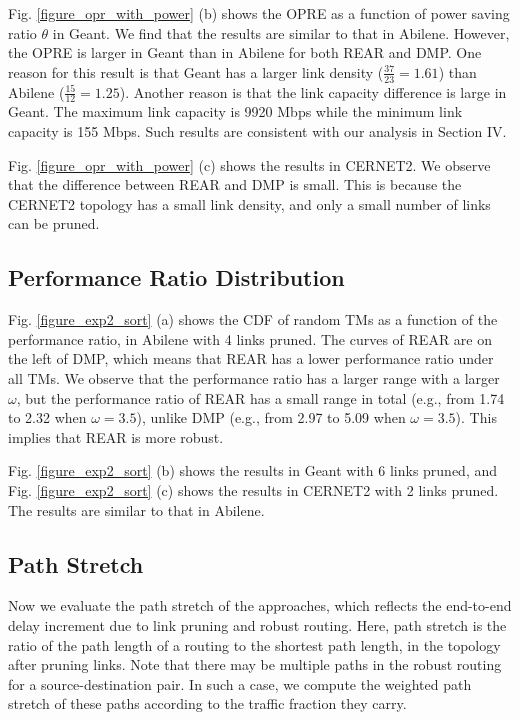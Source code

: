 \documentclass[conference]{IEEEtran}
\begin{document}
Fig. \ref{figure_opr_with_power} (b) shows the OPRE as a function of power saving ratio $\theta$ in Geant. We find that the results are similar to that in Abilene. However, the OPRE is larger in Geant than in Abilene for both REAR and DMP. One reason for this result is that Geant has a larger link density ($\frac{37}{23} = 1.61$) than Abilene ($\frac{15}{12} = 1.25$). Another reason is that the link capacity difference is large in Geant. The maximum link capacity is 9920 Mbps while the minimum link capacity is 155 Mbps. Such results are consistent with our analysis in Section IV.

Fig. \ref{figure_opr_with_power} (c) shows the results in CERNET2. We observe that the difference between REAR and DMP is small. This is because the CERNET2 topology has a small link density, and only a small number of links can be pruned.

\subsection{Performance Ratio Distribution}
Fig. \ref{figure_exp2_sort} (a) shows the CDF of random TMs as a function of the performance ratio, in Abilene with 4 links pruned. The curves of REAR are on the left of DMP, which means that REAR has a lower performance ratio under all TMs. We observe that the performance ratio has a larger range with a larger $\omega$, but the performance ratio of REAR has a small range in total (e.g., from 1.74 to 2.32 when $\omega = 3.5$), unlike DMP (e.g., from 2.97 to 5.09 when $\omega = 3.5$). This implies that REAR is more robust.

Fig. \ref{figure_exp2_sort} (b) shows the results in Geant with 6 links pruned, and Fig. \ref{figure_exp2_sort} (c) shows the results in CERNET2 with 2 links pruned. The results are similar to that in Abilene.

\subsection{Path Stretch}

Now we evaluate the path stretch of the approaches, which reflects the end-to-end delay increment due to link pruning and robust routing. Here, path stretch is the ratio of the path length of a routing to the shortest path length, in the topology after pruning links. Note that there may be multiple paths in the robust routing for a source-destination pair. In such a case, we compute the weighted path stretch of these paths according to the traffic fraction they carry.
\end{document}

